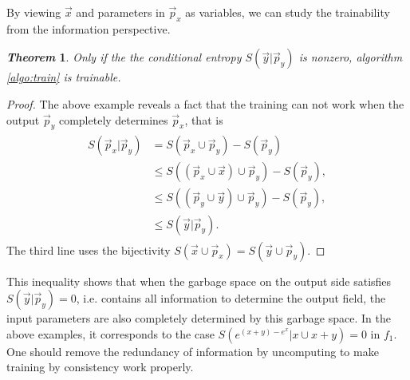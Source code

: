 \documentclass[aps,twocolumn,longbibliography,english,superscriptaddress]{revtex4-1}
\newcommand{\<}{\langle}
\renewcommand{\>}{\rangle}
\newcommand{\vx}{{\vec x}}
\newcommand{\vp}{{\vec p}}
\newcommand{\vy}{{\vec y}}
\newtheorem{theorem}{\textit{Theorem}}
\theoremstyle{definition}\newtheorem{definition}{\textit{Definition}}
\begin{document}
By viewing $\vx$ and parameters in $\vp_x$ as variables, we can study the trainability from the information perspective.
\begin{theorem}
    Only if the the conditional entropy $S(\vy|\vp_y)$ is nonzero, algorithm \ref{algo:train} is trainable.
\end{theorem}
\begin{proof}
The above example reveals a fact that the training can not work when the output $\vp_y$ completely determines $\vp_x$, that is
\begin{align}
    \begin{split}
        S(\vp_x | \vp_y) &= S(\vp_x \cup \vp_y) - S(\vp_y)\\
        &\leq S\left((\vp_x \cup \vx) \cup \vp_y \right) - S(\vp_y),\\
        &\leq S\left((\vp_y \cup \vy) \cup \vp_y\right) - S(\vp_y),\\
    &\leq S(\vy|\vp_y).
    \end{split}
\end{align}
The third line uses the bijectivity $S(\vx \cup \vp_x) = S(\vy \cup \vp_y)$.
\end{proof}
This inequality shows that when the garbage space on the output side satisfies $S(\vy | \vp_y) = 0$, i.e. contains all information to determine the output field, the input parameters are also completely determined by this garbage space.
In the above examples, it corresponds to the case $S\left(e^{(x+y)-e^x} | x \cup x + y\right) = 0$ in $f_1$.
One should remove the redundancy of information by uncomputing to make training by consistency work properly.
\end{document}
